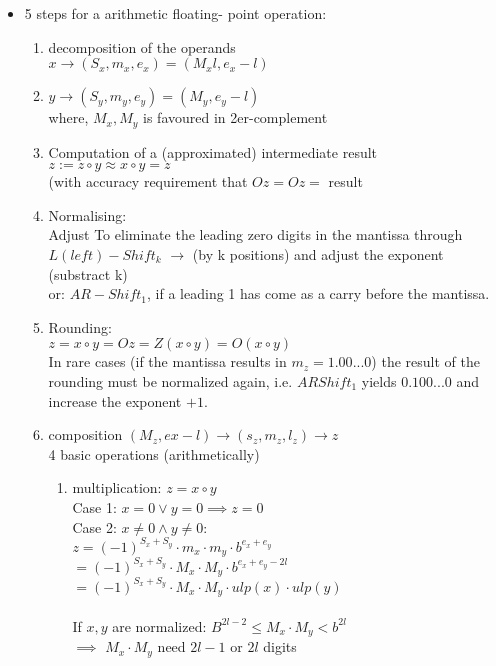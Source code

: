 \begin{itemize}
\item 5 steps for a arithmetic floating- point operation:
\begin{enumerate}
\item decomposition of the operands  \\
$x\to (S_x,m_x,e_x)=(M_xl,e_x-l)$ \\
\item $y\to (S_y,m_y,e_y)=(M_y,e_y-l)$ \\
where, $M_x, M_y$ is favoured in 2er-complement 
\item Computation of a (approximated) intermediate result  \\
$z:=z\circ y \approx x\circ y = z$ \\
(with accuracy requirement that $Oz=Oz=$ result 
\item Normalising: \\
Adjust To eliminate the leading zero digits in the mantissa through $L(left)-Shift_k$ $\to$ (by k positions) and adjust the exponent (substract k) \\
or: $AR-Shift_1$, if a leading 1 has come as a carry before the mantissa. 
\item Rounding: \\
$z=x\circ y=Oz=Z(x\circ y)=O(x\circ y)$ \\
In rare cases (if the mantissa results in $m_z=1.00...0$) the result of the rounding must be normalized again, i.e. $ARShift_1$ yields $0.100...0$ and increase the exponent $+1$.
\item composition $(M_z, ex-l)\to (s_z,m_z,l_z)\to z$ \\
4 basic operations (arithmetically) \\
\begin{enumerate}
\item multiplication: $z=x\circ y$ \\
Case 1: $x=0 \lor y=0 \implies z=0$ \\
Case 2: $x\not = 0 \land y\not =0: $\\
$z=(-1)^{S_x+S_y}\cdot m_x\cdot m_y\cdot b^{e_x+e_y} $ \\
$=(-1)^{S_x+S_y}\cdot M_x\cdot M_y\cdot b^{e_x+e_y-2l} $ \\
$ =(-1)^{S_x+S_y}\cdot M_x\cdot M_y\cdot ulp(x)\cdot ulp(y) $ \\
\\
If $x,y$ are normalized: $B^{2l-2}\le M_x\cdot M_y< b^{2l}$ \\
$\implies$ $M_x\cdot M_y$ need $2l-1$ or $2l$ digits \\

\end{enumerate}
\end{enumerate}
\end{itemize}
